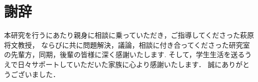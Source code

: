 \chapter*{謝辞}
本研究を行うにあたり親身に相談に乗っていただき，ご指導してくださった萩原将文教授，
ならびに共に問題解決，議論，相談に付き合ってくださった研究室の先輩方，同期，後輩の皆様に深く感謝いたします.
そして，学生生活を送るうえで日々サポートしていただいた家族に心より感謝いたします．
誠にありがとうございました．
